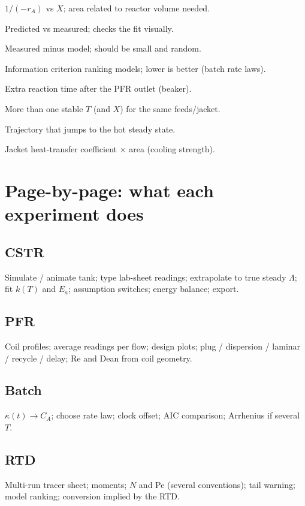 \documentclass[11pt,a4paper]{article}
\begin{document}
\begin{description}[style=nextline,leftmargin=0pt,font=\sffamily\bfseries\color{accent}]
  \item[Levenspiel plot] \(1/(-r_A)\) vs \(X\); area related to reactor volume needed.
  \item[Parity plot] Predicted vs measured; checks the fit visually.
  \item[Residual] Measured minus model; should be small and random.
  \item[AIC] Information criterion ranking models; lower is better (batch rate laws).
  \item[Sample delay] Extra reaction time after the PFR outlet (beaker).
  \item[Multiple steady states] More than one stable \(T\) (and \(X\)) for the same feeds/jacket.
  \item[Runaway] Trajectory that jumps to the hot steady state.
  \item[UA] Jacket heat-transfer coefficient \(\times\) area (cooling strength).
\end{description}

\section{Page-by-page: what each experiment does}

\subsection{CSTR}
Simulate / animate tank; type lab-sheet readings; extrapolate to true steady \(\Lambda\); fit \(k(T)\) and \(E_a\);
assumption switches; energy balance; export.

\subsection{PFR}
Coil profiles; average readings per flow; design plots; plug / dispersion / laminar / recycle / delay; Re and Dean from
coil geometry.

\subsection{Batch}
\(\kappa(t)\to C_A\); choose rate law; clock offset; AIC comparison; Arrhenius if several \(T\).

\subsection{RTD}
Multi-run tracer sheet; moments; \(N\) and Pe (several conventions); tail warning; model ranking; conversion implied by
the RTD.
\end{document}
